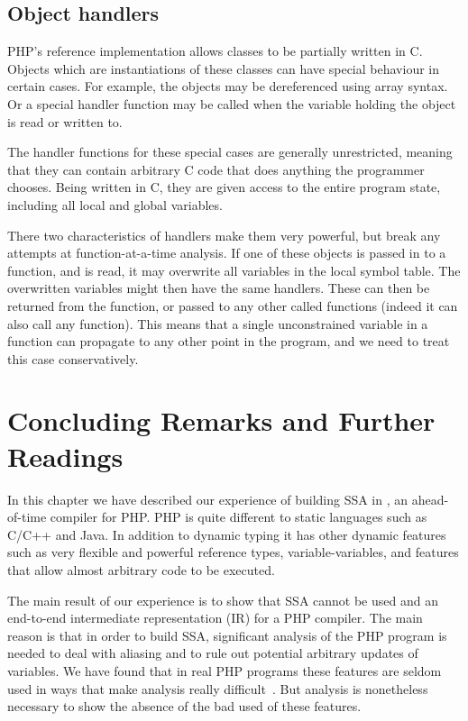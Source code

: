 \subsection{Object handlers}
PHP's reference implementation allows classes to be partially written
in C.  Objects which are instantiations of these classes can have
special behaviour in certain cases.  For example, the objects may be
dereferenced using array syntax. Or a special handler function may be
called when the variable holding the object is read or written to.

The handler functions for these special cases are generally
unrestricted, meaning that they can contain arbitrary C code that does
anything the programmer chooses.  Being written in C, they are given
access to the entire program state, including all local and global
variables.

There two characteristics of handlers make them very powerful, but
break any attempts at function-at-a-time analysis.  If one of these
objects is passed in to a function, and is read, it may overwrite all
variables in the local symbol table.  The overwritten variables might
then have the same handlers.  These can then be returned from the
function, or passed to any other called functions (indeed it can also
call any function).  This means that a single unconstrained variable
in a function can propagate to any other point in the program, and we
need to treat this case conservatively.


\section{Concluding Remarks and Further Readings}
In this chapter we have described our experience of building SSA in
\phc, an ahead-of-time compiler for PHP. PHP is quite different to
static languages such as C/C++ and Java. In addition to
dynamic typing it has other dynamic features such as very flexible and
powerful reference types, variable-variables, and features that allow
almost arbitrary code to be executed.

The main result of our experience is to show that SSA cannot be used
and an end-to-end intermediate representation (IR) for a PHP
compiler. The main reason is that in order to build SSA, significant
analysis of the PHP program is needed to deal with aliasing and to
rule out potential arbitrary updates of variables. We have found that
in real PHP programs these features are seldom used in ways that make
analysis really difficult~\cite{Biggar2010}. But analysis is
nonetheless necessary to show the absence of the bad used of these
features.

